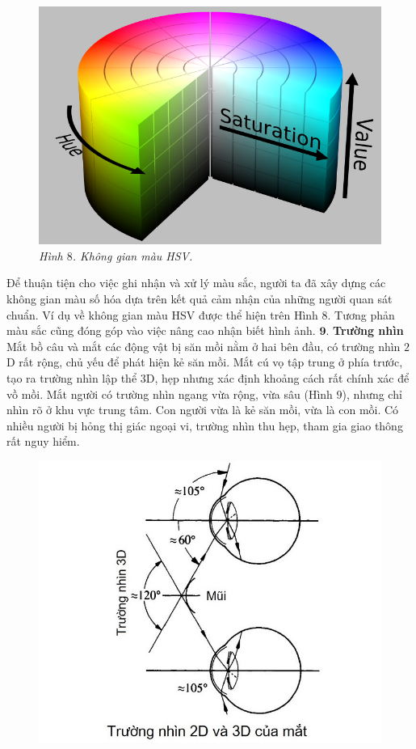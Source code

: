 \begin{multicols}{2}
\begin{figure}[H]
		\vspace*{-5pt}
		\centering
		\captionsetup{labelformat= empty, justification=centering}
		\includegraphics[width= 1\linewidth]{8}
		\caption{\small\textit{\color{timhieukhoahoc}Hình $8$. Không gian màu HSV.}}
		\vspace*{-10pt}
	\end{figure}
	Để thuận tiện cho việc ghi nhận và xử lý màu sắc, người ta đã xây dựng các không gian màu số hóa dựa trên kết quả cảm nhận của những người quan sát chuẩn. Ví dụ về không gian màu HSV được thể hiện trên Hình $8$.
	\vskip 0.1cm
	Tương phản màu sắc cũng đóng góp vào việc nâng cao nhận biết hình ảnh.
	\vskip 0.1cm
	$\pmb{9.}$ \textbf{\color{timhieukhoahoc}Trường nhìn}
	\vskip 0.1cm 
	Mắt bồ câu và mắt các động vật bị săn mồi nằm ở hai bên đầu, có trường nhìn $2$D rất rộng, chủ yếu để phát hiện kẻ săn mồi. Mắt cú vọ tập trung ở phía trước, tạo ra trường nhìn lập thể $3$D, hẹp nhưng xác định khoảng cách rất chính xác để vồ mồi. 
	\vskip 0.1cm
	Mắt người có trường nhìn ngang vừa rộng, vừa sâu (Hình $9$), nhưng chỉ nhìn rõ ở khu vực trung tâm. Con người vừa là kẻ săn mồi, vừa là con mồi. Có nhiều người bị hỏng thị giác ngoại vi, trường nhìn thu hẹp, tham gia giao thông rất nguy hiểm. 
	\begin{figure}[H]
		\vspace*{-5pt}
		\centering
		\captionsetup{labelformat= empty, justification=centering}
		\includegraphics[width= 0.95\linewidth]{9}

\end{figure}
\end{multicols}

